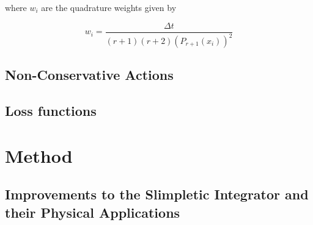 \documentclass[10pt]{iopart}
\def\SI{Slimpletic Integrator}
\begin{document}
where $w_i$ are the quadrature weights given by

\begin{equation}
  w_i = \frac{\Delta t}{(r + 1)(r + 2)(P_{r + 1}(x_i))^2}
\end{equation}


%


\subsection{Non-Conservative Actions}
\subsection{Loss functions}
\label{sec:intro-lf}



\section{Method}

\subsection{Improvements to the \SI{} and their Physical Applications}

\end{document}
